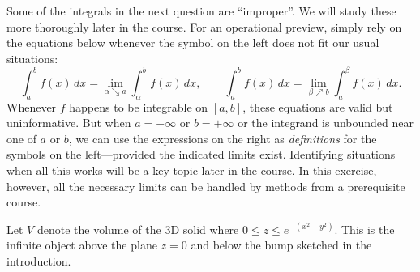 \documentclass{exam}
\newcommand\starscore[2]{%
  \pgfmathsetmacro\pgfxa{#1 + 1}%
  \tikzstyle{scorestars}=[star, star points=5, star point ratio=2.5, draw, inner sep=0.12em, anchor=outer point 3]%
  \begin{tikzpicture}[baseline=2pt]
    \foreach \i in {1, ..., #2} {
      \pgfmathparse{\i<=#1 ? "black" : "white"}
      \edef\starcolor{\pgfmathresult}
      \draw (\i*1em, 0) node[name=star\i, scorestars, fill=\starcolor, semithick]  {};
    }
    \pgfmathparse{#1>int(#1) ? int(#1+1) : 0}
    \let\partstar=\pgfmathresult
    \ifnum\partstar>0
      \pgfmathsetmacro\starpart{#1-(int(#1)}
      \path [clip] ($(star\partstar.outer point 3)!(star\partstar.outer point 2)!(star\partstar.outer point 4)$) rectangle 
      ($(star\partstar.outer point 2 |- star\partstar.outer point 1)!\starpart!(star\partstar.outer point 1 -| star\partstar.outer point 5)$);
      \fill (\partstar*1em, 0) node[scorestars, fill=black]  {};
    \fi
  \end{tikzpicture}%
}
\renewcommand{\a}{\alpha}
\renewcommand{\b}{\beta}
\begin{document}
\begin{questions}
\begin{EnvUplevel}
\noindent
Some of the integrals in the next question are ``improper''.
We will study these more thoroughly later in the course.
For an operational preview, simply rely on the equations below
whenever the symbol on the left does not fit our usual situations:
\[
\int_a^b f(x)\,dx = \lim_{\alpha\searrow a} \int_\a^b f(x)\,dx,
\qquad
\int_a^b f(x)\,dx = \lim_{\beta\nearrow b} \int_a^{\b} f(x)\,dx.
\]
Whenever $f$ happens to be integrable on $[a,b]$, 
these equations are valid but uninformative.
But when $a=-\infty$ or $b=+\infty$ or the integrand is
unbounded near one of $a$ or $b$,
we can use the expressions on the right as \textit{definitions}
for the symbols on the left---provided the indicated limits exist. 
Identifying situations when all this works will be a key topic
later in the course.
In this exercise, however, all the necessary limits
can be handled by methods from a prerequisite course.
\end{EnvUplevel}

\question[4]
Let $V$ denote the volume of the 3D solid where 
$0 \le z \le e^{-(x^2+y^2)}$.
This is the infinite object above the plane $z=0$
and below the bump sketched in the introduction.

\end{questions}
\end{document}
